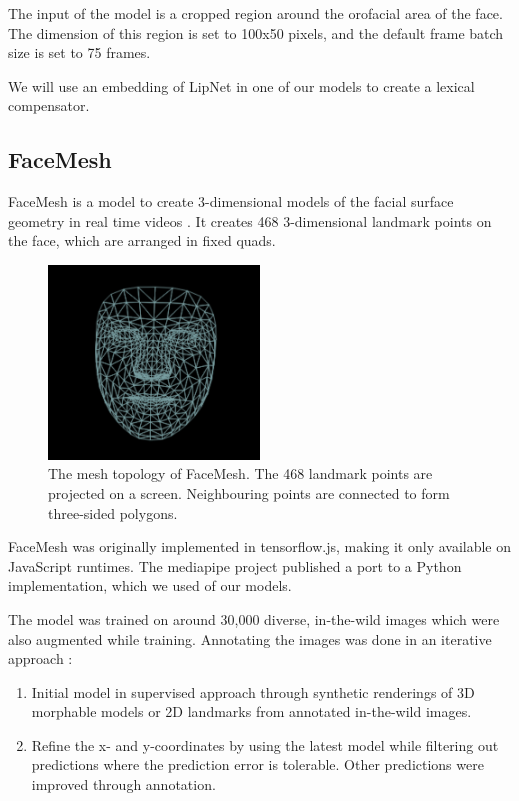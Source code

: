 The input of the model is a cropped region around the orofacial area of the face. The dimension of this region is set to 100x50 pixels, and the default frame batch size is set to 75 frames.

We will use an embedding of LipNet in one of our models to create a lexical compensator.

\subsection{FaceMesh}


FaceMesh is a model to create 3-dimensional models of the facial surface geometry in real time videos \cite{kartynnik2019facemesh}. It creates 468 3-dimensional landmark points on the face, which are arranged in fixed quads.

\begin{figure}
    \centering
    \includegraphics[width=0.5\textwidth]{res/facemesh2.png}
    \caption{The mesh topology of FaceMesh. The 468 landmark points are projected on a screen. Neighbouring points are connected to form three-sided polygons.}
    \label{fig:facemesh}
\end{figure}

FaceMesh was originally implemented in tensorflow.js, making it only available on JavaScript runtimes. The mediapipe project published a port to a Python implementation, which we used of our models.

The model was trained on around 30,000 diverse, in-the-wild images which were also augmented while training. Annotating the images was done in an iterative approach \cite{kartynnik2019facemesh}:
\begin{enumerate}
    \item Initial model in supervised approach through synthetic renderings of 3D morphable models or 2D landmarks from annotated in-the-wild images.
    \item Refine the x- and y-coordinates by using the latest model while filtering out predictions where the prediction error is tolerable. Other predictions were improved through annotation.
\end{enumerate}
